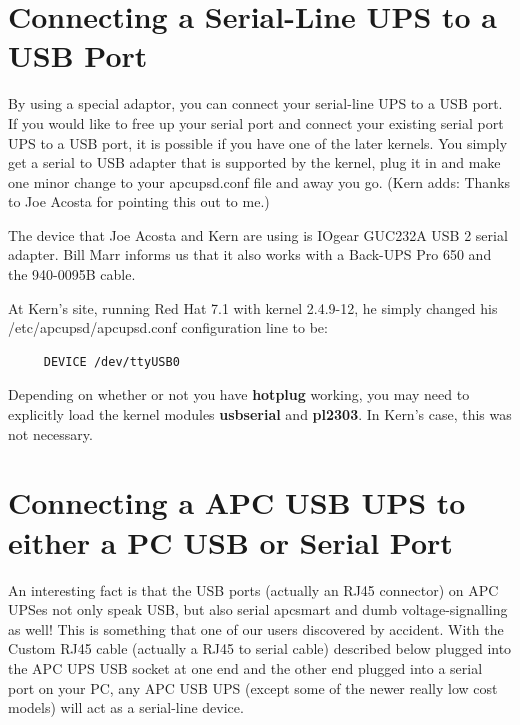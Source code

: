 {{{{{{{\label{Connecting-a-Serial_002dLine-UPS-to-a-USB-Port}

\section*{Connecting a Serial-Line UPS to a USB Port}

\label{index-Serial-on-USB-190}
By using a special adaptor, you can connect your serial-line UPS to a USB
port. If you would like to free up your serial port and connect your existing
serial port UPS to a USB port, it is possible if you have one of the later
kernels. You simply get a serial to USB adapter that is supported by the
kernel, plug it in and make one minor change to your apcupsd.conf file and
away you go. (Kern adds: Thanks to Joe Acosta for pointing this out to me.)  

The device that Joe Acosta and Kern are using is IOgear GUC232A USB 2 serial
adapter. Bill Marr informs us that it also works with a Back-UPS Pro 650 and
the 940-0095B cable.  

At Kern's site, running Red Hat 7.1 with kernel 2.4.9-12, he simply changed
his /etc/apcupsd/apcupsd.conf configuration line to be: 

\footnotesize
\begin{verbatim}
     DEVICE /dev/ttyUSB0
\end{verbatim}
\normalsize

Depending on whether or not you have {\bf hotplug} working, you may need to
explicitly load the kernel modules {\bf usbserial} and {\bf pl2303}. In Kern's
case, this was not necessary. 

\label{Connecting-a-APC-USB-UPS-to-either-a-PC-USB-or-Serial-Port}

\section*{Connecting a APC USB UPS to either a PC USB or Serial Port}

An interesting fact is that the USB ports (actually an RJ45 connector) on APC
UPSes not only speak USB, but also serial apcsmart and dumb voltage-signalling
as well! This is something that one of our users discovered by accident. With
the Custom RJ45 cable (actually a RJ45 to serial cable) described below
plugged into the APC UPS USB socket at one end and the other end plugged into
a serial port on your PC, any APC USB UPS (except some of the newer really low
cost models) will act as a serial-line device. 

}}}}}}}
